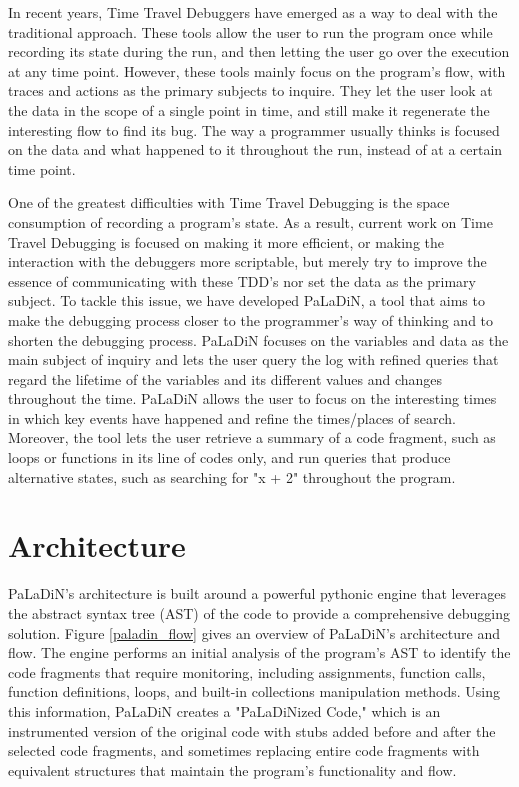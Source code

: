 \documentclass[sigconf,review]{acmart}
\begin{document}
    In recent years, Time Travel Debuggers have emerged as a way to deal with the traditional approach. These tools allow the user to run the program once while recording its state during the run, and then letting the user go over the execution at any time point. However, these tools mainly focus on the program's flow, with traces and actions as the primary subjects to inquire. They let the user look at the data in the scope of a single point in time, and still make it regenerate the interesting flow to find its bug. The way a programmer usually thinks is focused on the data and what happened to it throughout the run, instead of at a certain time point.

    One of the greatest difficulties with Time Travel Debugging is the space consumption of recording a program's state. As a result, current work on Time Travel Debugging is focused on making it more efficient, or making the interaction with the debuggers more scriptable, but merely try to improve the essence of communicating with these TDD's nor set the data as the primary subject. To tackle this issue, we have developed PaLaDiN, a tool that aims to make the debugging process closer to the programmer's way of thinking and to shorten the debugging process. PaLaDiN focuses on the variables and data as the main subject of inquiry and lets the user query the log with refined queries that regard the lifetime of the variables and its different values and changes throughout the time. PaLaDiN allows the user to focus on the interesting times in which key events have happened and refine the times/places of search. Moreover, the tool lets the user retrieve a summary of a code fragment, such as loops or functions in its line of codes only, and run queries that produce alternative states, such as searching for "x + 2" throughout the program.


    \section{Architecture}
    PaLaDiN's architecture is built around a powerful pythonic engine that leverages the abstract syntax tree (AST) of the
    code to provide a comprehensive debugging solution.
    Figure \ref{paladin_flow} gives an overview of PaLaDiN’s architecture and flow.
    The engine performs an initial analysis of the program's AST to
    identify the code fragments that require monitoring, including assignments, function calls, function definitions, loops,
    and built-in collections manipulation methods. Using this information, PaLaDiN creates a "PaLaDiNized Code," which is an
    instrumented version of the original code with stubs added before and after the selected code fragments, and sometimes
    replacing entire code fragments with equivalent structures that maintain the program's functionality and flow.
\end{document}
